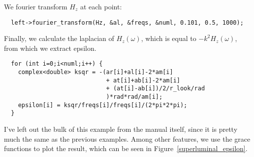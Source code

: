 We fourier transform $H_z$ at each point:

\begin{verbatim}
  left->fourier_transform(Hz, &al, &freqs, &numl, 0.101, 0.5, 1000);
\end{verbatim}
\begin{comment}
  delete[] freqs;
  printf("Working on middle fourier transform...\n");
  middle->fourier_transform(Hz, &am, &freqs, &numr, 0.101, 0.5, 1000);
  delete[] freqs;
  printf("Working on top fourier transform...\n");
  top->fourier_transform(Hz, &at, &freqs, &numr, 0.101, 0.5, 1000);
  delete[] freqs;
  printf("Working on bottom fourier transform...\n");
  bottom->fourier_transform(Hz, &ab, &freqs, &numr, 0.101, 0.5, 1000);
  delete[] freqs;
  printf("Working on right fourier transform...\n");
  right->fourier_transform(Hz, &ar, &freqs, &numr, 0.101, 0.5, 1000);
  if (numl != numr) printf("Aaack you need both nums to be the same!\n");
  g.new_set();
  g.set_legend("\\x\\e\\s1\\N");
  complex<double> *epsilon = new complex<double>[numl];
\end{comment}

Finally, we calculate the laplacian of $H_z(\omega)$, which is equal to
$-k^2 H_z(\omega)$, from which we extract epsilon.

\begin{verbatim}
  for (int i=0;i<numl;i++) {
    complex<double> ksqr = -(ar[i]+al[i]-2*am[i]
                             + at[i]+ab[i]-2*am[i]
                             + (at[i]-ab[i])/2/r_look/rad
                             )*rad*rad/am[i];
    epsilon[i] = ksqr/freqs[i]/freqs[i]/(2*pi*2*pi);
  }
\end{verbatim}

I've left out the bulk of this example from the manual itself, since it
is pretty much the same as the previous examples.  Among other features, we
use the grace functions to plot the result, which can be seen in
Figure~\ref{superluminal_epsilon}.

\begin{comment}
  for (int i=0;i<numl;i++) {
    g.output_point(real(freqs[i]), real(epsilon[i]));
  }
  g.new_set();
  g.set_legend("\\x\\e\\s2\\N");
  for (int i=0;i<numl;i++) {
    g.output_point(real(freqs[i]), imag(epsilon[i]));
  }
}
\end{comment}
